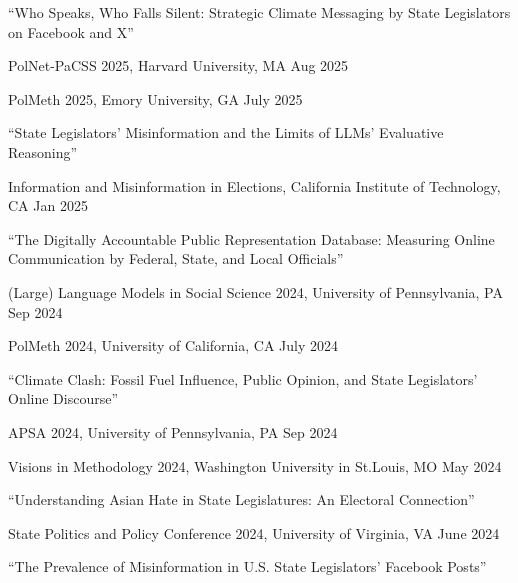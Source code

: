 \documentclass[10.5pt,]{article}
\providecommand{\tightlist}{%
	\setlength{\itemsep}{0pt}\setlength{\parskip}{0pt}}
\renewenvironment{itemize}{
	\begin{list}{}{
			\setlength{\leftmargin}{1.5em}
		}
	}{
	\end{list}
}
\begin{document}
\begin{itemize}
\tightlist
\item
  ``Who Speaks, Who Falls Silent: Strategic Climate Messaging by State
  Legislators on Facebook and X''

  \begin{itemize}
  \tightlist
  \item
    PolNet-PaCSS 2025, Harvard University, MA \hfill Aug 2025
  \item
    PolMeth 2025, Emory University, GA \hfill July 2025
  \end{itemize}
\item
  ``State Legislators' Misinformation and the Limits of LLMs' Evaluative
  Reasoning''

  \begin{itemize}
  \tightlist
  \item
    Information and Misinformation in Elections, California Institute of
    Technology, CA \hfill Jan 2025
  \end{itemize}
\item
  ``The Digitally Accountable Public Representation Database: Measuring
  Online Communication by Federal, State, and Local Oﬀicials''

  \begin{itemize}
  \tightlist
  \item
    (Large) Language Models in Social Science 2024, University of
    Pennsylvania, PA \hfill Sep 2024
  \item
    PolMeth 2024, University of California, CA \hfill July 2024
  \end{itemize}
\item
  ``Climate Clash: Fossil Fuel Influence, Public Opinion, and State
  Legislators' Online Discourse''

  \begin{itemize}
  \tightlist
  \item
    APSA 2024, University of Pennsylvania, PA \hfill Sep 2024
  \item
    Visions in Methodology 2024, Washington University in St.Louis, MO
    \hfill May 2024
  \end{itemize}
\item
  ``Understanding Asian Hate in State Legislatures: An Electoral
  Connection''

  \begin{itemize}
  \tightlist
  \item
    State Politics and Policy Conference 2024, University of Virginia,
    VA \hfill June 2024
  \end{itemize}
\item
  ``The Prevalence of Misinformation in U.S. State Legislators' Facebook
  Posts''


\end{itemize}
\end{document}
